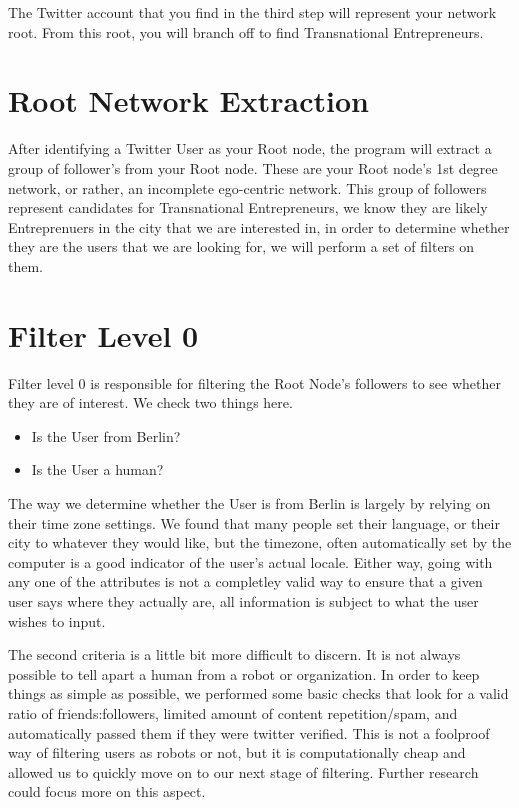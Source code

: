 The Twitter account that you find in the third step will represent your network root. From this root, you will branch off to find Transnational Entrepreneurs.

\section{Root Network Extraction}
After identifying a Twitter User as your Root node, the program will
extract a group of follower's from your Root node. These are your Root
node's 1st degree network, or rather, an incomplete ego-centric
network. This group of followers represent candidates for
Transnational Entrepreneurs, we know they are likely Entreprenuers in
the city that we are interested in, in order to determine whether they
are the users that we are looking for, we will perform a set of
filters on them.

\section{Filter Level 0}
Filter level 0 is responsible for filtering the Root Node's followers
to see whether they are of interest. We check two things here.

\begin{itemize}
\item Is the User from Berlin?
\item Is the User a human?
\end{itemize}

The way we determine whether the User is from Berlin is largely by
relying on their time zone settings. We found that many people set
their language, or their city to whatever they would like, but the
timezone, often automatically set by the computer is a good indicator
of the user's actual locale. Either way, going with any one of the
attributes is not a completley valid way to ensure that a given user
says where they actually are, all information is subject to what the
user wishes to input.

The second criteria is a little bit more difficult to discern. It is
not always possible to tell apart a human from a robot or
organization. In order to keep things as simple as possible, we
performed some basic checks that look for a valid ratio of
friends:followers, limited amount of content repetition/spam, and
automatically passed them if they were twitter verified. This is not a
foolproof way of filtering users as robots or not, but it is
computationally cheap and allowed us to quickly move on to our next
stage of filtering. Further research could focus more on this aspect.

